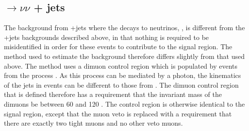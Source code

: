 \subsection{\PZ$\rightarrow \nu\nu$ + jets}
\label{sec:promptznunu}
The background from \PZ+jets where the \PZ decays to neutrinos, \Znunu, is different from the \PW+jets backgrounds described above, in that nothing is required to be misidentified in order for these events to contribute to the signal region. The method used to estimate the \Znunu background therefore differs slightly from that used above. The method uses a dimuon control region which is populated by events from the process \Zmumu. As this process can be mediated by a photon, the kinematics of the jets in \Zmumu events can be different to those from \Znunu. The dimuon control region that is defined therefore has a requirement that the invariant mass of the dimuons be between 60 and 120 \GeV. The control region is otherwise identical to the signal region, except that the muon veto is replaced with a requirement that there are exactly two tight muons and no other veto muons.

